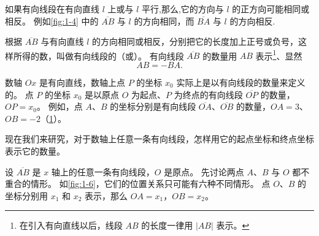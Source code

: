 如果有向线段在有向直线 $l$ 上或与 $l$ 平行,那么,它的方向与 $l$ 的正方向可能相同或相反。
例如\cref{fig:1-4} 中的 $\overline{AB}$ 与 $l$ 的方向相同，而 $\overline{BA}$ 与 $l$ 的方向相反.

根据 $\overline{AB}$ 与有向直线 $l$ 的方向相同或相反，分别把它的长度加上正号或负号，这样所得的数，叫做有向线段的（或）。
有向线段 $\overline{AB}$ 的数量用 $AB$ 表示\footnote{在引入有向直线以后，线段 $AB$ 的长度一律用 $|AB|$ 表示。}、显然
\[AB = - BA.\]

数轴 $Ox$ 是有向直线，数轴上点 $P$ 的坐标 $x_0$ 实际上是以有向线段的数量来定义的。
点 $P$ 的坐标 $x_0$ 是以原点 $O$ 为起点、$P$ 为终点的有向线段 $\overline{OP}$ 的数量，$OP=x_0$。
例如，点 $A$、$B$ 的坐标分别是有向线段 $\overline{OA}$、$\overline{OB}$ 的数量，$OA=3$、$OB=-2$（\cref{fig:1-5}）。
\begin{figure}
  \caption{}\label{fig:1-5}
\end{figure}

现在我们来研究，对于数轴上任意一条有向线段，怎样用它的起点坐标和终点坐标表示它的数量。

设 $\overline{AB}$ 是 $x$ 轴上的任意一条有向线段，$O$ 是原点。
先讨论两点 $A$、$B$ 与 $O$ 都不重合的情形。
如\cref{fig:1-6}，它们的位置关系只可能有六种不同情形。
点 $O$、$B$ 的坐标分别用 $x_1$ 和 $x_2$ 表示，那么 $OA=x_1$，$OB=x_2$。


